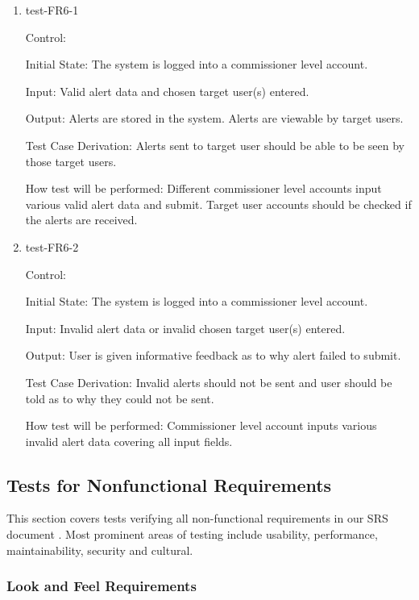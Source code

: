 \documentclass[12pt, titlepage]{article}
\begin{document}
\begin{enumerate}

  \item{test-FR6-1\\}

  Control: 

  Initial State: The system is logged into a commissioner level account.

  Input: Valid alert data and chosen target user(s) entered.

  Output: Alerts are stored in the system. Alerts are viewable by target users.

  Test Case Derivation: Alerts sent to target user should be able to be 
  seen by those target users.

  How test will be performed: Different commissioner level accounts input
  various valid alert data and submit. Target user accounts should be checked
  if the alerts are received.

  \item{test-FR6-2\\}

  Control: 

  Initial State: The system is logged into a commissioner level account.

  Input: Invalid alert data or invalid chosen target user(s) entered.

  Output: User is given informative feedback as to why alert failed to submit.

  Test Case Derivation: Invalid alerts should not be sent and user should
  be told as to why they could not be sent.

  How test will be performed: Commissioner level account inputs various invalid
  alert data covering all input fields.

\end{enumerate}

\subsection{Tests for Nonfunctional Requirements}

This section covers tests verifying all non-functional requirements in our SRS
document \cite{SRS}. Most prominent areas of testing include usability,
performance, maintainability, security and cultural.

\subsubsection{Look and Feel Requirements}
\end{document}
